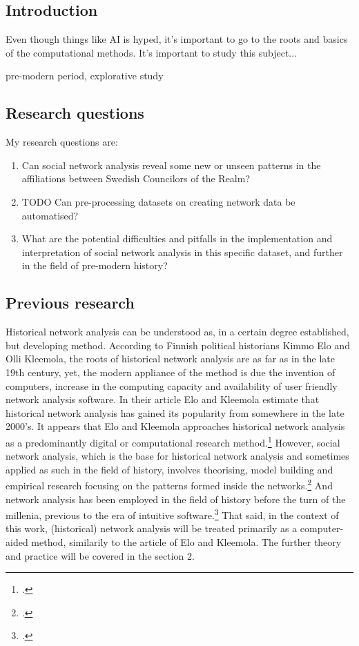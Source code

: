 \documentclass[a4paper,12pt]{article}
\begin{document}
\begin{onehalfspace} %
\section{Introduction}

Even though things like AI is hyped, it's important to go to the roots and basics of the computational methods. It's important to study this subject...

pre-modern period, explorative study

\subsection{Research questions}

My research questions are:
\begin{enumerate}
	\item Can social network analysis reveal some new or unseen patterns in the affiliations between Swedish Councilors of the Realm?
	\item TODO Can pre-processing datasets on creating network data be automatised?
	\item What are the potential difficulties and pitfalls in the implementation and interpretation of social network analysis in this specific dataset, and further in the field of pre-modern history?
\end{enumerate} 

\subsection{Previous research}
Historical network analysis can be understood as, in a certain degree established, but developing method. According to Finnish political historians Kimmo Elo and Olli Kleemola, the roots of historical network analysis are as far as in the late 19th century, yet, the modern appliance of the method is due the invention of computers, increase in the computing capacity and availability of user friendly network analysis software. In their article Elo and Kleemola estimate that historical network analysis has gained its popularity from somewhere in the late 2000's. It appears that Elo and Kleemola approaches historical network analysis as a predominantly digital or computational research method.\footcite[p. 415-417.]{eloAklee15} However, social network analysis, which is the base for historical network analysis and sometimes applied as such in the field of history, involves theorising, model building and empirical research focusing on the patterns formed inside the networks.\footcite[p. 22-24.]{Keats-R2007} And network analysis has been employed in the field of history before the turn of the millenia, previous to the era of intuitive software.\footcite[TODO check!]{AronssonEtA1999} That said, in the context of this work, (historical) network analysis will be treated primarily as a computer-aided method, similarily to the article of Elo and Kleemola. The further theory and practice will be covered in the section 2.


\end{onehalfspace}
\end{document}
